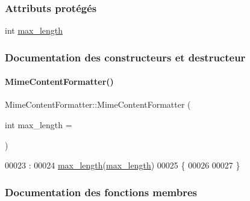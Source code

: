 \subsubsection*{Attributs protégés}
\begin{DoxyCompactItemize}
\item 
int \hyperlink{class_simple_mail_1_1_mime_content_formatter_a5c7278fb3bd794bc4ff408169cfef6fd}{max\+\_\+length}
\end{DoxyCompactItemize}


\subsubsection{Documentation des constructeurs et destructeur}
\mbox{\label{class_simple_mail_1_1_mime_content_formatter_a69caccbcd231c7e84160415ed16f639b}} 
\paragraph{\texorpdfstring{Mime\+Content\+Formatter()}{MimeContentFormatter()}}
{\footnotesize\ttfamily Mime\+Content\+Formatter\+::\+Mime\+Content\+Formatter (\begin{DoxyParamCaption}\item[{int}]{max\+\_\+length = {} }\end{DoxyParamCaption})\hspace{0.3cm}{\ttfamily [explicit]}}


\begin{DoxyCode}
00023                                                          :
00024     \hyperlink{class_simple_mail_1_1_mime_content_formatter_a5c7278fb3bd794bc4ff408169cfef6fd}{max\_length}(\hyperlink{class_simple_mail_1_1_mime_content_formatter_a5c7278fb3bd794bc4ff408169cfef6fd}{max\_length})
00025 \{
00026 
00027 \}
\end{DoxyCode}


\subsubsection{Documentation des fonctions membres}
\mbox{\label{class_simple_mail_1_1_mime_content_formatter_ac36a08fb6878efb0a6450170ebfc8766}} 
